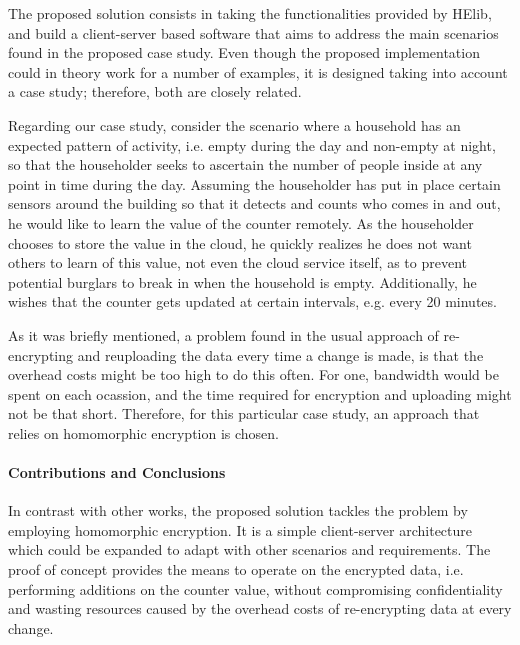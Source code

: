 The proposed solution consists in taking the functionalities provided by HElib, and build a client-server based software that aims to address the main scenarios found in the proposed case study. Even though the proposed implementation could in theory work for a number of examples, it is designed taking into account a case study; therefore, both are closely related.

Regarding our case study, consider the scenario where a household has an expected pattern of activity, i.e. empty during the day and non-empty at night, so that the householder seeks to ascertain the number of people inside at any point in time during the day. Assuming the householder has put in place certain sensors around the building so that it detects and counts who comes in and out, he would like to learn the value of the counter remotely. As the householder chooses to store the value in the cloud, he quickly realizes he does not want others to learn of this value, not even the cloud service itself, as to prevent potential burglars to break in when the household is empty. Additionally, he wishes that the counter gets updated at certain intervals, e.g. every 20 minutes. 

As it was briefly mentioned, a problem found in the usual approach of re-encrypting and reuploading the data every time a change is made, is that the overhead costs might be too high to do this often. For one, bandwidth would be spent on each ocassion, and the time required for encryption and uploading might not be that short. Therefore, for this particular case study, an approach that relies on homomorphic encryption is chosen.

\paragraph{Contributions and Conclusions}
In contrast with other works, the proposed solution tackles the problem by employing homomorphic encryption. It is a simple client-server architecture which could be expanded to adapt with other scenarios and requirements. The proof of concept provides the means to operate on the encrypted data, i.e. performing additions on the counter value, without compromising confidentiality and wasting resources caused by the overhead costs of re-encrypting data at every change.


